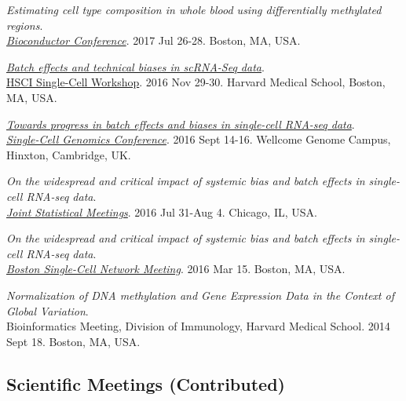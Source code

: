 \documentclass[10pt]{article}
\begin{document}
\item 
{\it Estimating cell type composition in whole blood using differentially methylated regions}. \\
\href{http://bioconductor.org/help/course-materials/2017/BioC2017/}{{\it Bioconductor Conference}}. 2017 Jul 26-28. Boston, MA, USA.
\item 
{\it \href{https://github.com/hms-dbmi/scw/tree/master/scw2016/tutorials/batcheffects}{Batch effects and technical biases in scRNA-Seq data}}. \\ 
\href{http://hsci.harvard.edu/event/save-date-single-cell-analysis-workshop}{HSCI Single-Cell Workshop}. 2016 Nov 29-30. Harvard Medical School, Boston, MA, USA.
\item
{\it \href{https://speakerdeck.com/stephaniehicks/towards-progress-in-batch-effects-and-biases-in-single-cell-rna-seq-data}{Towards progress in batch effects and biases in single-cell RNA-seq data}}. \\
\href{https://coursesandconferences.wellcomegenomecampus.org/events/item.aspx?e=596}{{\it Single-Cell Genomics Conference}}. 2016 Sept 14-16. Wellcome Genome Campus, Hinxton, Cambridge, UK.
\item
{\it On the widespread and critical impact of systemic bias and batch effects in single-cell RNA-seq data}. \\
\href{https://www.amstat.org/meetings/jsm/2016/onlineprogram/MainSearchResults.cfm}{{\it Joint Statistical Meetings}}. 2016 Jul 31-Aug 4. Chicago, IL, USA.
\item
{\it On the widespread and critical impact of systemic bias and batch effects in single-cell RNA-seq data}. \\
\href{http://hsci.harvard.edu/event/widespread-and-critical-impact-systemic-bias-and-batch-effects-single-cell-rna-seq-data?delta=0}{{\it Boston Single-Cell Network Meeting}}. 2016 Mar 15. Boston, MA, USA.
\item 
{\it Normalization of DNA methylation and Gene Expression Data in the Context of Global Variation}. \\
Bioinformatics Meeting, Division of Immunology, Harvard Medical School. 2014 Sept 18. Boston, MA, USA.




\subsection*{Scientific Meetings (Contributed)}
\end{document}
